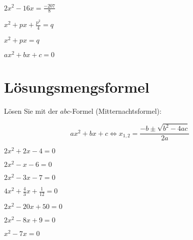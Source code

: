 {\begin{bbwAufgabenBlock}
\item $ 2x^2 - 16 x= \frac{-207}{8}$

\item $ x^2 + px + \frac{p^2}{4}= q$

\item $ x^2 + px =  q$

\item $ ax^2+bx+c=0 $


\end{bbwAufgabenBlock}
\newpage


\section{Lösungsmengsformel}
Lösen Sie mit der $abc$-Formel (Mitternachtsformel):

$$ax^2+bx+c \Longleftrightarrow x_{1,2}=\frac{-b\pm\sqrt{b^2-4ac}}{2a}$$

\begin{bbwAufgabenBlock}
\item $2x^2+2x -4 = 0$

\item $2x^2 - x - 6 = 0$

\item $2x^2-3x-7 = 0$

\item $4x^2+\frac43 x + \frac1{12} =0 $

\item $ 2x^2 -20x + 50 = 0 $
\LoesungsBlock{$\lx=\left\{ 5 \right\}$}

\item $2x^2 -8x +9 =0 $
\LoesungsBlock{$\lx=\left\{  \right\}$}

\item $ x^2-7x= 0$


\end{bbwAufgabenBlock}}
